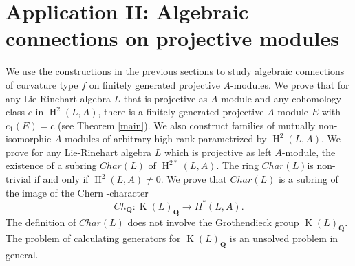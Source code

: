 \documentclass{amsart}
\theoremstyle{plain}
\theoremstyle{definition}
\theoremstyle{remark}
\numberwithin{equation}{theorem}
\begin{document}
\section{Application II: Algebraic connections on projective modules}

We use the constructions in the previous sections to study algebraic connections of curvature type
$f$ on finitely generated projective ${A}$-modules.  We prove that for any Lie-Rinehart algebra $L$ that is
projective as ${A}$-module and any cohomology class $c$ in ${\operatorname{H} }^2(L, {A})$, there is a finitely generated projective ${A}$-module
$E$ with $c_1(E)=c$ (see Theorem \ref{main}). We also construct families of mutually non-isomorphic ${A}$-modules 
of arbitrary high rank parametrized by ${\operatorname{H} }^2(L,{A})$. 
We prove for any Lie-Rinehart algebra $L$ which is projective as left ${A}$-module, 
the existence of a subring $Char(L)$ of ${\operatorname{H} }^{2*}(L,{A})$. The ring $Char(L)$is non-trivial if and only if ${\operatorname{H} }^2(L,{A})\neq 0$.
We prove that $Char(L)$ is a  subring of the image of the Chern -character 
\[ Ch_{\mathbf{Q} }:{\operatorname{K}}(L)_{\mathbf{Q} } \rightarrow H^*(L,{A}).\]
The definition of $Char(L)$ does not involve the Grothendieck group ${\operatorname{K}}(L)_{\mathbf{Q} }$. The problem of calculating generators for 
${\operatorname{K}}(L)_{\mathbf{Q} }$ is an unsolved problem in general.
\end{document}
